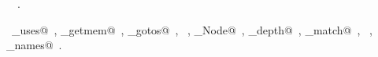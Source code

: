 \documentclass{report}
\begin{document}
\begin{flushleft}
\begin{minipage}{\linewidth}
\begin{list}{}{\setlength{\itemsep}{-\parsep}\setlength{\itemindent}{-\leftmargin}}
\end{list}
\vspace{-2ex}
\footnotesize\addtolength{\baselineskip}{-1ex}
\begin{list}{}{\setlength{\itemsep}{-\parsep}\setlength{\itemindent}{-\leftmargin}}
\item \NWtxtIdentsDefed\nobreak\  \verb@search@\nobreak\ .\end{list}
\vspace{-2ex}
\footnotesize\addtolength{\baselineskip}{-1ex}
\begin{list}{}{\setlength{\itemsep}{-\parsep}\setlength{\itemindent}{-\leftmargin}}
\item \NWtxtIdentsUsed\nobreak\  \verb@add_uses@\nobreak\ , \verb@arena_getmem@\nobreak\ , \verb@build_gotos@\nobreak\ , \verb@depths@\nobreak\ , \verb@Goto_Node@\nobreak\ , \verb@max_depth@\nobreak\ , \verb@reject_match@\nobreak\ , \verb@root@\nobreak\ , \verb@user_names@\nobreak\ .\end{list}
\end{minipage}\\[4ex]
\end{flushleft}
\end{document}
